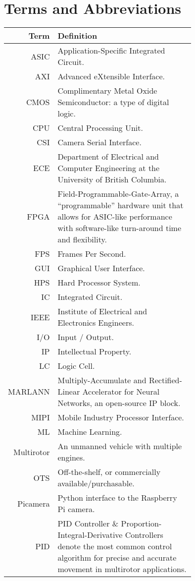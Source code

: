 \section*{Terms and Abbreviations}

\begin{tabular}[h]{rp{0.75\linewidth}}
    \hline
    \textbf{Term} & \textbf{Definition}\\
    \hline

    ASIC & Application-Specific Integrated Circuit.\\
    AXI & Advanced eXtensible Interface. \\
    CMOS & Complimentary Metal Oxide Semiconductor: a type of digital logic. \\
    CPU & Central Processing Unit. \\
    CSI & Camera Serial Interface. \\
    ECE & Department of Electrical and Computer Engineering at the University of British Columbia.\\
    FPGA & Field-Programmable-Gate-Array, a ``programmable'' hardware unit that allows for ASIC-like performance with software-like turn-around time and flexibility.\\
    FPS & Frames Per Second.\\
    GUI & Graphical User Interface. \\
    HPS & Hard Processor System. \\
    IC & Integrated Circuit. \\
    IEEE & Institute of Electrical and Electronics Engineers. \\
    I/O & Input / Output. \\
    IP & Intellectual Property. \\
    LC & Logic Cell. \\
    MARLANN & Multiply-Accumulate and Rectified-Linear Accelerator for Neural Networks, an open-source IP block. \\
    MIPI & Mobile Industry Processor Interface. \\
    ML & Machine Learning.\\
    Multirotor & An unmanned vehicle with multiple engines. \\
    OTS & Off-the-shelf, or commercially available/purchasable. \\
    Picamera & Python interface to the Raspberry Pi camera. \\
    PID & PID Controller \& Proportion-Integral-Derivative Controllers denote the most common control algorithm for precise and accurate movement in multirotor applications.\\

\end{tabular}
